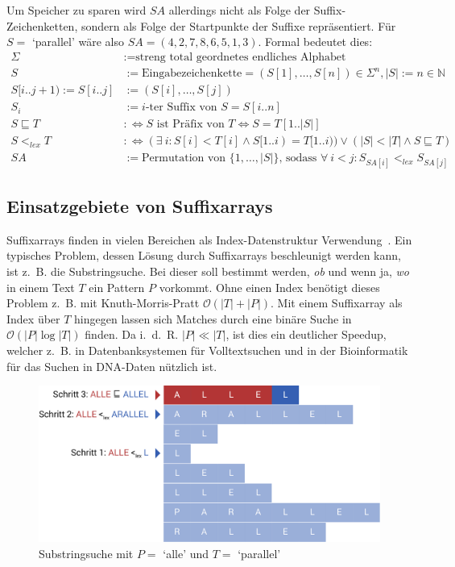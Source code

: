 \documentclass[twoside,11pt]{article}
\theoremstyle{break}
\begin{document}
Um Speicher zu sparen wird $SA$ allerdings nicht als Folge der Suffix-Zeichenketten, sondern als Folge der Startpunkte der Suffixe repräsentiert. Für $S =$ `parallel' wäre also $SA = (4, 2, 7, 8, 6, 5, 1, 3)$. Formal bedeutet dies:
\begin{align*}
	\Sigma &:= \text{streng total geordnetes endliches Alphabet} \\
	S &:= \text{Eingabezeichenkette} = (S[1], \dots, S[n]) \in \Sigma^n, |S| := n \in \mathbb{N} \\
	S[i .. j + 1) := S[i .. j] &:= (S[i], \dots, S[j]) \\
	S_i &:= \text{$i$-ter Suffix von $S$} = S[i .. n] \\
	S \sqsubseteq T &:\Leftrightarrow \text{$S$ ist Präfix von $T$} \Leftrightarrow S = T[1 .. |S|] \\
	S <_{lex} T &:\Leftrightarrow (\exists\ i: S[i] < T[i] \land S[1 .. i) = T[1 .. i)) \lor (|S| < |T| \land S \sqsubseteq T) \\
	SA &:= \text{Permutation von } \{1, \dots, |S|\} \text{, sodass } \forall\ i < j: S_{SA[i]} <_{lex} S_{SA[j]}
\end{align*}

\subsection{Einsatzgebiete von Suffixarrays}

Suffixarrays finden in vielen Bereichen als Index-Datenstruktur Verwendung~\cite{wikiSuffixArray}. Ein typisches Problem, dessen Lösung durch Suffixarrays beschleunigt werden kann, ist z.~B. die Substringsuche. Bei dieser soll bestimmt werden, \textit{ob} und wenn ja, \textit{wo} in einem Text $T$ ein Pattern $P$ vorkommt. Ohne einen Index benötigt dieses Problem z.~B. mit Knuth-Morris-Pratt $\mathcal{O}(|T| + |P|)$. Mit einem Suffixarray als Index über $T$ hingegen lassen sich Matches durch eine binäre Suche in $\mathcal{O}(|P| \log |T|)$ finden. Da i.~d.~R. $|P| \ll |T|$, ist dies ein deutlicher Speedup, welcher z.~B. in Datenbanksystemen für Volltextsuchen und in der Bioinformatik für das Suchen in DNA-Daten nützlich ist.

\begin{figure}[h]
	\centering
	\includegraphics[width=0.7\linewidth,bb=0 0 1010 462]{./assets/substringSearch.pdf}
	\caption{Substringsuche mit $P =$ `alle' und $T =$ `parallel'}
\label{fig:substringSearch}
\end{figure}
\end{document}
